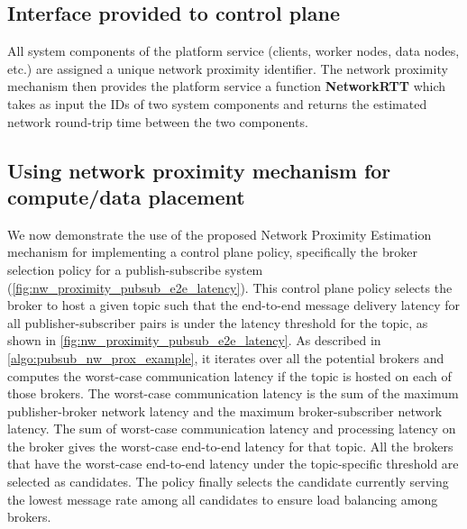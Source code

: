 \subsection{Interface provided to control plane}
All system components of the platform service (clients, worker nodes, data nodes, etc.) are assigned a unique network proximity identifier. The network proximity mechanism then provides the platform service a function \textbf{NetworkRTT} which takes as input the IDs of two system components and returns the estimated network round-trip time between the two components. 

\subsection{Using network proximity mechanism for compute/data placement}
\label{sec:policy_using_nw_prox}

We now demonstrate the use of the proposed Network Proximity Estimation mechanism for implementing a control plane policy, specifically the broker selection policy for a publish-subscribe system (\cref{fig:nw_proximity_pubsub_e2e_latency}). This control plane policy selects the broker to host a given topic such that the end-to-end message delivery latency for all publisher-subscriber pairs is under the latency threshold for the topic, as shown in \cref{fig:nw_proximity_pubsub_e2e_latency}. As described in \cref{algo:pubsub_nw_prox_example}, it iterates over all the potential brokers and computes the worst-case communication latency if the topic is hosted on each of those brokers. The worst-case communication latency is the sum of the maximum publisher-broker network latency and the maximum broker-subscriber network latency. The sum of worst-case communication latency and processing latency on the broker gives the worst-case end-to-end latency for that topic. All the brokers that have the worst-case end-to-end latency under the topic-specific threshold are selected as candidates. The policy finally selects the candidate currently serving the lowest message rate among all candidates to ensure load balancing among brokers.

